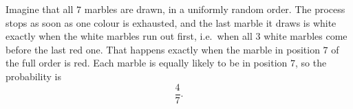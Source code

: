 Imagine that all $7$ marbles are drawn, in a uniformly random order. The process stops as soon as one colour is exhausted, and the last marble it draws is white exactly when the white marbles run out first, i.e.\ when all $3$ white marbles come before the last red one. That happens exactly when the marble in position $7$ of the full order is red. Each marble is equally likely to be in position $7$, so the probability is
\[
\boxed{\dfrac{4}{7}}.
\]
